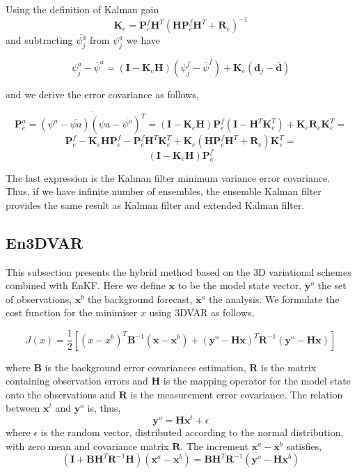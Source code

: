 \documentclass[a4,12pt]{article}
\numberwithin{equation}{section}
\begin{document}
Using the definition of Kalman gain $$\textbf{K}_{e} = \textbf{P}_{e}^{f}\textbf{H}^{T}(\textbf{H}\textbf{P}^{f}_{e}\textbf{H}^{T}+\textbf{R}_{e})^{-1}$$ and subtracting $\overline{\psi_{j}^{a}}$ from $\psi_{j}^{a}$ we have

$$\psi_{j}^{a}-\overline{\psi}^{a} = (\textbf{I}-\textbf{K}_{e}\textbf{H})(\psi_{j}^{f} - \overline{\psi}^{f})+\textbf{K}_{e}(\textbf{d}_{j}-\overline{\textbf{d}})$$

and we derive the error covariance as follows,

$$\textbf{P}_{e}^{a} = \overline {(\psi^{a} - \overline{\psi{a}})(\psi{a} - \overline{\psi^{a}})^{T}} = (\textbf{I}-\textbf{K}_{e}\textbf{H})\textbf{P}_{e}^{f}(\textbf{I}-\textbf{H}^{T}\textbf{K}_{e}^{T})+\textbf{K}_{e}\textbf{R}_{e}\textbf{K}_{e}^{T}=$$$$\textbf{P}_{e}^{f} - \textbf{K}_{e}\textbf{H}\textbf{P}_{e}^{f} - \textbf{P}_{e}^{f}\textbf{H}^{T}\textbf{K}_{e}^{T} + \textbf{K}_{e}(\textbf{H}\textbf{P}_{e}^{f}\textbf{H}^{T}+\textbf{R}_{e})\textbf{K}_{e}^{T} =$$$$ (\textbf{I}-\textbf{K}_{e}\textbf{H})\textbf{P}_{e}^{f}$$ 

The last expression is the Kalman filter minimum variance error covariance. Thus, if we have infinite number of ensembles, the ensemble Kalman filter provides the same result as Kalman filter and extended Kalman filter.

\subsection{En3DVAR}
This subsection presents the hybrid method based on the 3D variational schemes combined with EnKF.
Here we define $\textbf{x}$ to be the model state vector, $\textbf{y}^{o}$ the set of observations, $\textbf{x}^{b}$ the background forecast, $\textbf{x}^{a}$ the analysis. We formulate the cost function for the minimiser $x$ using 3DVAR as follows,

$$J(x) = \frac{1}{2}[(x-x^{b})^{T}\textbf{B}^{-1}(\textbf{x}-\textbf{x}^{b})+(\textbf{y}^{o}-\textbf{H}\textbf{x})^{T}\textbf{R}^{-1}(\textbf{y}^{o}-\textbf{Hx})]$$

where $\textbf{B}$ is the background error covariances estimation, $\textbf{R}$ is the matrix containing observation errors and $\textbf{H}$ is the mapping operator for the model state onto the observations and  $\textbf{R}$ is the measurement error covariance. The relation between $\textbf{x}^{t}$ and $\textbf{y}^{o}$ is, thus, $$\textbf{y}^{o} = \textbf{H}\textbf{x}^{t} + \epsilon$$ where $\epsilon$ is the random vector, distributed according to the normal distribution, with zero mean and covariance matrix $\textbf{R}$. The increment $\textbf{x}^{a} - \textbf{x}^{b}$ satisfies, 
$$(\textbf{I} + \textbf{BH}^{T}\textbf{R}^{-1}\textbf{H})(\textbf{x}^{a}-\textbf{x}^{b}) = \textbf{B}\textbf{H}^{T}\textbf{R}^{-1}(\textbf{y}^{o}-\textbf{H}\textbf{x}^{b})$$   
\end{document}
